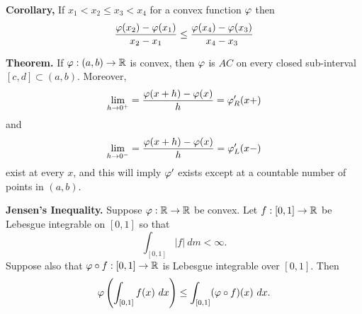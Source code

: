 \vs

\textbf{Corollary,} If $x_1 < x_2 \leq x_3 < x_4$ for a convex function $\varphi$ then
\[\frac{\varphi(x_2) - \varphi(x_1)}{x_2 - x_1}\leq \frac{\varphi(x_4) - \varphi(x_3)}{x_4 - x_3}\]

\vs

\textbf{Theorem.} If $\varphi:(a,b) \rightarrow \mathbb{R}$ is convex, then $\varphi$ is $AC$ on every closed sub-interval $[c,d]\subset (a,b)$. Moreover,
\[\lim_{h\rightarrow 0^+} = \frac{\varphi(x + h) - \varphi(x)}{h} = \varphi^\prime_R(x+)\]
and 
\[\lim_{h\rightarrow 0^-} = \frac{\varphi(x + h) - \varphi(x)}{h} = \varphi^\prime_L(x-)\]
exist at every $x$, and this will imply $\varphi^\prime$ exists except at a countable number of points in $(a,b)$.

\vs

\textbf{Jensen's Inequality.} Suppose $\varphi:\mathbb{R}\rightarrow \mathbb{R}$ be convex. Let $f:[0,1]\rightarrow \mathbb{R}$ be Lebesgue integrable on $[0,1]$ so that 
\[\int_{[0,1]}|f|\ dm < \infty.\]
Suppose also that $\varphi \circ f:[0,1]\rightarrow \mathbb{R}$ is Lebesgue integrable over $[0,1]$. Then 
\[\varphi\left(\int_{[0,1]} f(x)\ dx\right) \leq \int_{[0,1]}(\varphi\circ f)(x)\ dx.\]